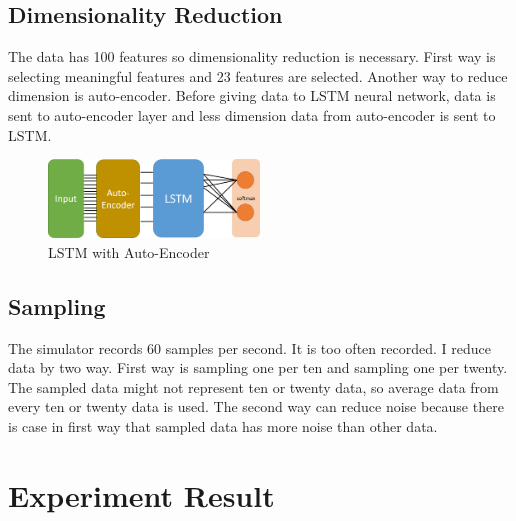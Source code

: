 \documentclass[draft,dvipsnames]{drexel-thesis}
\begin{document}
\begin{thesis}
\section{Dimensionality Reduction}
The data has 100 features so dimensionality reduction is necessary. First way is selecting meaningful features and 23 features are selected. Another way to reduce dimension is auto-encoder. Before giving data to LSTM neural network, data is sent to auto-encoder layer and less dimension data from auto-encoder is sent to LSTM. 

\begin{figure}[H]
    \centering
    \includegraphics[width=0.5\textwidth]{pictures/applied_lstm_autoencoder.png}
    \caption{LSTM with Auto-Encoder}
    \label{fig:Applied LSTM With Auto-Encoder}
\end{figure}


\section{Sampling}
The simulator records 60 samples per second. It is too often recorded. I reduce data by two way. First way is sampling one per ten and sampling one per twenty. The sampled data might not represent ten or twenty data, so average data from every ten or twenty data is used. The second way can reduce noise because there is case in first way that sampled data has more noise than other data.


\chapter{Experiment Result}



\end{thesis}
\end{document}

